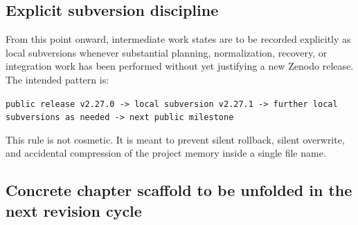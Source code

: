 \subsection*{Explicit subversion discipline}

From this point onward, intermediate work states are to be recorded explicitly as local subversions whenever substantial planning, normalization, recovery, or integration work has been performed without yet justifying a new Zenodo release. The intended pattern is:
\begin{center}
\texttt{public release v2.27.0 -> local subversion v2.27.1 -> further local subversions as needed -> next public milestone}
\end{center}
This rule is not cosmetic. It is meant to prevent silent rollback, silent overwrite, and accidental compression of the project memory inside a single file name.


\subsection*{Concrete chapter scaffold to be unfolded in the next revision cycle}

